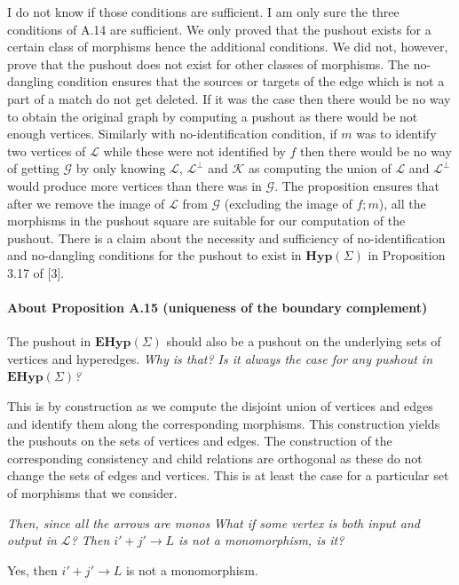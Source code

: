 \documentclass{article}
\begin{document}
I do not know if those conditions are sufficient. 
I am only sure the three conditions of A.14 are sufficient.
We only proved that the pushout exists for a certain class of morphisms hence the additional conditions.
We did not, however, prove that the pushout does not exist for other classes of morphisms.
The no-dangling condition ensures that the sources or targets of the edge which is not a part of a match do not get deleted.
If it was the case then there would be no way to obtain the original graph by computing a pushout as there would be not enough vertices.
Similarly with no-identification condition, if $m$ was to identify two vertices of $\mathcal{L}$ while these were not identified by $f$ then there would be no way of getting $\mathcal{G}$ by only knowing $\mathcal{L}$, $\mathcal{L^{\bot}}$ and $\mathcal{K}$ as computing the union of $\mathcal{L}$ and $\mathcal{L^{\bot}}$ would produce more vertices than there was in $\mathcal{G}$.
The proposition ensures that after we remove the image of $\mathcal{L}$ from $\mathcal{G}$ (excluding the image of $f;m$), all the morphisms in the pushout square are suitable for our computation of the pushout.
There is a claim about the necessity and sufficiency of no-identification and no-dangling conditions for the pushout to exist in $\mathbf{Hyp}(\Sigma)$ in Proposition 3.17 of [3].

\paragraph{About Proposition A.15 (uniqueness of the boundary complement)}
The pushout in $\mathbf{EHyp}(\Sigma)$ should also be a pushout on the
underlying sets of vertices and hyperedges.
\textit{Why is that? Is it always the case for any pushout in $\mathbf{EHyp}(\Sigma)$?}

This is by construction as we compute the disjoint union of vertices and edges and identify them along the corresponding morphisms.
This construction yields the pushouts on the sets of vertices and edges.
The construction of the corresponding consistency and child relations are orthogonal as these do not change the sets of edges and vertices.
This is at least the case for a particular set of morphisms that we consider.

\textit{Then, since all the arrows are monos}
\textit{What if some vertex is both input and output in $\mathcal{L}$? Then $i' + j' \to L$ is not a
monomorphism, is it?}

Yes, then $i' + j' \to L$ is not a monomorphism.
\end{document}
